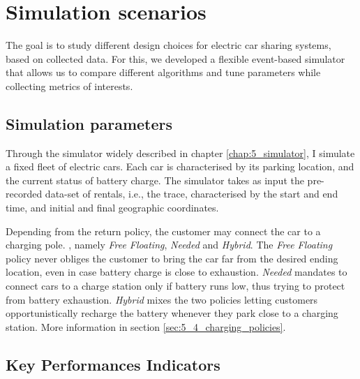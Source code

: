 \section{Simulation scenarios }

\label{sec:7_4_modelling}

The goal is to study different design choices for electric car sharing systems, based on collected data. For this, we developed a flexible event-based simulator that allows us to compare different algorithms and tune  parameters while collecting metrics of interests.

\subsection{Simulation parameters}

Through the simulator widely described in chapter \ref{chap:5_simulator}, I simulate a fixed fleet of electric cars. Each car is characterised by its parking location, and the current status of battery charge. 
The simulator takes as input the pre-recorded data-set of rentals, i.e., the trace, characterised by the start and end time, and initial and final geographic coordinates.

Depending from the return policy, the customer may connect the car to a charging pole. , namely \textit{Free Floating}, \textit{Needed} and \textit{Hybrid}. The \textit{Free Floating} policy never obliges the customer to bring the car far from the desired ending location, even in case battery charge is close to exhaustion. \textit{Needed} mandates to connect cars to a charge station only if battery runs low, thus trying to protect from battery exhaustion. \textit{Hybrid} mixes the two policies letting customers opportunistically recharge the battery whenever they park close to a charging station. More information in section \ref{sec:5_4_charging_policies}.




\subsection{Key Performances Indicators}
\label{sec:7_4_metrics}

